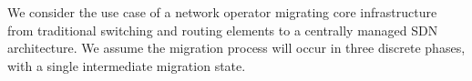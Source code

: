 We consider the use case of a network operator migrating core infrastructure from traditional switching and routing elements to a centrally managed SDN architecture. We assume the migration process will occur in three discrete phases, with a single intermediate migration state. 
